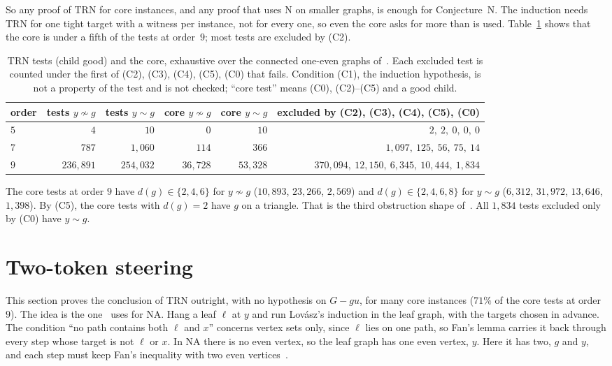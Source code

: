 \documentclass[11pt]{amsart}
\theoremstyle{definition}
\newcommand{\TRN}{\mathrm{TRN}}
\newcommand{\NA}{\mathrm{NA}}
\begin{document}
So any proof of $\TRN$ for core instances, and any proof that uses N on smaller graphs, is enough
for Conjecture~N. The induction needs $\TRN$ for one tight target with a witness per instance, not
for every one, so even the core asks for more than is used. Table~\ref{tab:counts} shows that the
core is under a fifth of the tests at order~$9$; most tests are excluded by (C2).

\begin{table}[ht]
\caption{$\TRN$ tests (child good) and the core, exhaustive over the connected one-even graphs
of~\cite{STL}. Each excluded test is counted under the first of (C2), (C3), (C4), (C5), (C0) that
fails. Condition (C1), the induction hypothesis, is not a property of the test and is not checked;
``core test'' means (C0), (C2)--(C5) and a good child.}
\label{tab:counts}\small
\begin{tabular}{@{}lrrrrr@{}}
\toprule
order & tests $y\not\sim g$ & tests $y\sim g$ & core $y\not\sim g$ & core $y\sim g$ &
excluded by (C2), (C3), (C4), (C5), (C0)\\
\midrule
$5$ & $4$ & $10$ & $0$ & $10$ & $2,\ 2,\ 0,\ 0,\ 0$\\
$7$ & $787$ & $1{,}060$ & $114$ & $366$ & $1{,}097,\ 125,\ 56,\ 75,\ 14$\\
$9$ & $236{,}891$ & $254{,}032$ & $36{,}728$ & $53{,}328$ &
$370{,}094,\ 12{,}150,\ 6{,}345,\ 10{,}444,\ 1{,}834$\\
\bottomrule
\end{tabular}
\end{table}

The core tests at order $9$ have $d(g)\in\{2,4,6\}$ for $y\not\sim g$ ($10{,}893$, $23{,}266$,
$2{,}569$) and $d(g)\in\{2,4,6,8\}$ for $y\sim g$ ($6{,}312$, $31{,}972$, $13{,}646$, $1{,}398$). By
(C5), the core tests with $d(g)=2$ have $g$ on a triangle. That is the third obstruction shape
of~\cite[\S6]{CN}. All $1{,}834$ tests excluded only by (C0) have $y\sim g$.

\section{Two-token steering}\label{sec:steer}

This section proves the conclusion of $\TRN$ outright, with no hypothesis on $G-gu$, for many core
instances ($71\%$ of the core tests at order $9$). The idea is the one~\cite{NA} uses for $\NA$. Hang a leaf $\ell$ at $y$ and run Lov\'asz's
induction in the leaf graph, with the targets chosen in advance. The condition ``no path contains
both $\ell$ and $x$'' concerns vertex sets only, since $\ell$ lies on one path, so Fan's lemma
carries it back through every step whose target is not $\ell$ or $x$. In $\NA$ there is no even
vertex, so the leaf graph has one even vertex, $y$. Here it has two, $g$ and $y$, and each step must
keep Fan's inequality with two even vertices~\cite[\S10(3)]{NA}.
\end{document}
